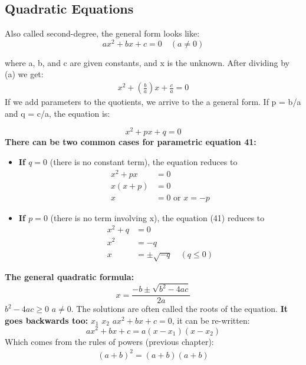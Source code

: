 \documentclass{article}
\begin{document}
\subsection{Quadratic Equations}

Also called second-degree, the general form looks like: 
\begin{equation}
ax^2 + bx + c = 0 \quad (a \neq 0)
\end{equation}

where a, b, and c are given constants, and x is the unknown. After dividing by (a) we get: 
\begin{align*}
x^2 + \left(\frac{b}{a}\right)x + \frac{c}{a} = 0
\end{align*}
If we add parameters to the quotients, we arrive to the a general form. If p = b/a and q = c/a, the equation is:

\begin{equation}
x^2 + px + q = 0
\end{equation}
\textbf{There can be two common cases for parametric equation 41:}

\begin{itemize}
\item \textbf{If $q = 0$} (there is no constant term), the equation reduces to 
\begin{align*}
x^2 + px &= 0 \\
x(x + p) &= 0 \\
x &= 0 \text{ or } x = -p
\end{align*}

\item  \textbf{If $p = 0$} (there is no term involving x), the equation (41) reduces to
\begin{align*}
x^2 + q &= 0 \\
x^2 &= -q \\
x &= \pm \sqrt{-q} \quad (q \leq 0)
\end{align*}
\end{itemize}
\textbf{The general quadratic formula: }
\begin{equation}
x = \frac{-b \pm \sqrt{b^2 - 4ac}}{2a}
\end{equation}
 $b^2 - 4ac \geq 0$  $a \neq 0$. The solutions are often called the roots of the equation. \textbf{ It goes backwards too:}  $x_1$  $x_2$  $ax^2 + bx + c = 0$, it can be re-written:
\begin{equation}
ax^2 + bx + c = a(x - x_1)(x - x_2)
\end{equation}
Which comes from the rules of powers (previous chapter):
\begin{align*}
(a+b)^2 = (a+b)(a+b)
\end{align*}
\end{document}
